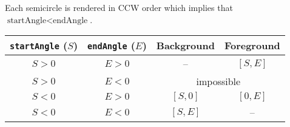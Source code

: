 \documentclass{article}
\begin{document}
  


Each semicircle is rendered in CCW order which implies that $\text{startAngle} < \text{endAngle}$.

\begin{tabular}{cccc}
    \toprule
    \verb|startAngle| ($S$) & \verb|endAngle| ($E$) & Background                     & Foreground \\
    \midrule
    $S> 0$                       & $E> 0$                       & --                             & $[S,E]$    \\
    $S>0$                        & $E<0$                        & \multicolumn{2}{c}{impossible}              \\
    $S< 0$                       & $E> 0$                       & $[S,0]$                        & $[0,E]$    \\
    $S< 0$                       & $E< 0$                       & $[S,E]$                        & --         \\
    \bottomrule
\end{tabular}
\end{document}
